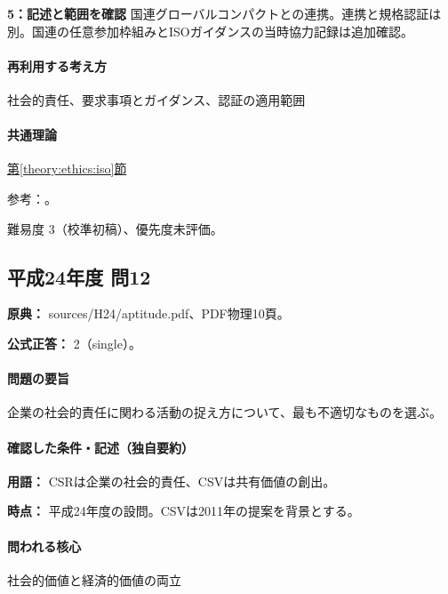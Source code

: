\noindent\textbf{5：記述と範囲を確認} 国連グローバルコンパクトとの連携。連携と規格認証は別。国連の任意参加枠組みとISOガイダンスの当時協力記録は追加確認。\par

\paragraph{再利用する考え方} 社会的責任、要求事項とガイダンス、認証の適用範囲

\paragraph{共通理論} \hyperref[theory:ethics:iso]{第\ref*{theory:ethics:iso}節}

\par 参考：\cite{iso26000,iso26000_project2010,iso_gri2014}。

\par 難易度 3（校準初稿）、優先度未評価。

\subsection{平成24年度 問12}
\label{q:h24-reg-apt-12}

\noindent\textbf{原典：} sources/H24/aptitude.pdf、PDF物理10頁。

\textbf{公式正答：} 2（single）。

\paragraph{問題の要旨} 企業の社会的責任に関わる活動の捉え方について、最も不適切なものを選ぶ。

\paragraph{確認した条件・記述（独自要約）}\mbox{}\par

\noindent\textbf{用語：} CSRは企業の社会的責任、CSVは共有価値の創出。\par

\noindent\textbf{時点：} 平成24年度の設問。CSVは2011年の提案を背景とする。\par

\paragraph{問われる核心} 社会的価値と経済的価値の両立

